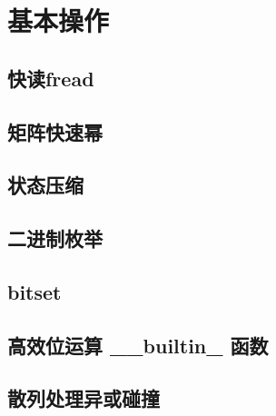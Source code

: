 \documentclass[landscape,twocolumn,twoside,a4paper]{article}
\begin{document}
\small

\newpage
\pagestyle{empty}
\renewcommand{\contentsname}{目录}
\tableofcontents
\newpage\clearpage
\newpage
\pagestyle{fancy}
\setcounter{page}{1}   %

\section{基本操作}

\subsection{快读fread}


\subsection{矩阵快速幂}


\subsection{状态压缩}


\subsection{二进制枚举}


\subsection{bitset}


\subsection{高效位运算 \_\_builtin\_ 函数}


\subsection{散列处理异或碰撞}

\end{document}
